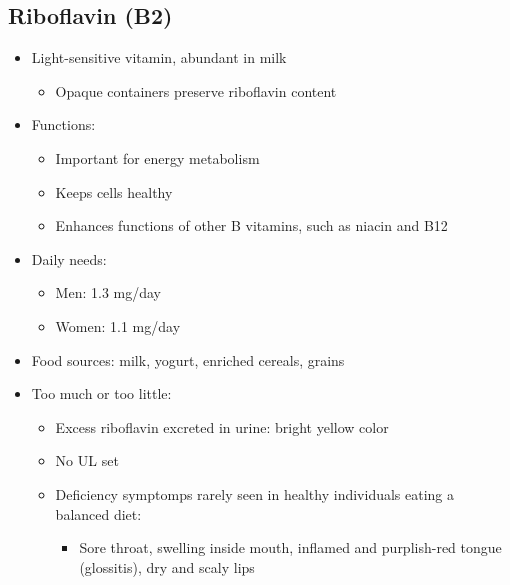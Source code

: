 \documentclass[12pt]{article}
\begin{document}
        \subsection{Riboflavin (B2)}
            \begin{itemize}
                \item Light-sensitive vitamin, abundant in milk
                    \begin{itemize}
                        \item Opaque containers preserve riboflavin content
                    \end{itemize}
                \item Functions:
                    \begin{itemize}
                        \item Important for energy metabolism
                        \item Keeps cells healthy
                        \item Enhances functions of other B vitamins, such as niacin and B12
                    \end{itemize}
                \item Daily needs:
                    \begin{itemize}
                        \item Men: 1.3 mg/day
                        \item Women: 1.1 mg/day
                    \end{itemize}
                \item Food sources: milk, yogurt, enriched cereals, grains
                \item Too much or too little:
                    \begin{itemize}
                        \item Excess riboflavin excreted in urine: bright yellow color
                        \item No UL set
                        \item Deficiency symptomps rarely seen in healthy individuals eating a balanced diet:
                            \begin{itemize}
                                \item Sore throat, swelling inside mouth, inflamed and purplish-red tongue (glossitis), dry and scaly lips
                            \end{itemize}
                    \end{itemize}
            \end{itemize}
\end{document}
